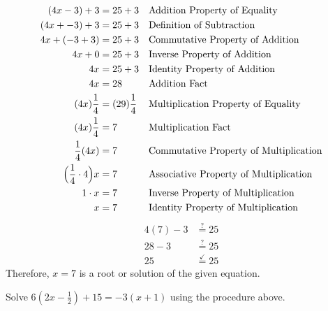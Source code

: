 \begin{align*}
(4x - 3)+ 3 &= 25 + 3  && \text{Addition Property of Equality}\\
(4x + -3) + 3 &= 25 + 3 && \text{Definition of Subtraction}\\
4x + (-3 + 3) &= 25 + 3 && \text{Commutative Property of Addition}\\
4x + 0 &= 25 + 3 && \text{Inverse Property of Addition}\\
4x &= 25 + 3 && \text{Identity Property of Addition}\\
4x &= 28 && \text{Addition Fact}\\
(4x)\frac{1}{4}&=(29) \frac{1}{4} && \text{Multiplication Property of Equality}\\
(4x)\frac{1}{4}&=7 && \text{Multiplication Fact}\\
\frac{1}{4}(4x)&=7 && \text{Commutative Property of Multiplication}\\
\Bigl( \frac{1}{4}\cdot 4\Bigr)x&=7 && \text{Associative Property of Multiplication}\\
1\cdot x&=7 && \text{Inverse Property of Multiplication}\\
x&=7 && \text{Identity Property of Multiplication}
\end{align*}
\CHECK
\begin{align*}
4 (7) - 3 &\overset{?}{=}25\\
28 - 3 &\overset{?}{=}25\\
25 & \overset{\checkmark}{=}25
\end{align*}
Therefore, $x=7$ is a root or solution of the given equation.
\begin{exercise}
\Item Solve $6(2x-\frac{1}{2})+15=-3(x+1)$ using the procedure above.

\end{exercise}